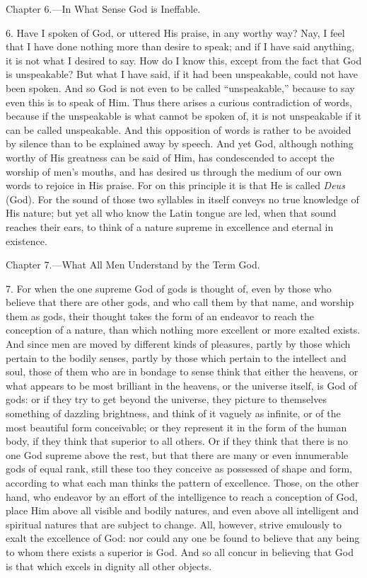
Chapter 6.—In What Sense God is Ineffable.

6. Have I spoken of God, or uttered His praise, in any worthy way? Nay, I feel that I have done nothing more than desire to speak; and if I have said anything, it is not what I desired to say. How do I know this, except from the fact that God is unspeakable? But what I have said, if it had been unspeakable, could not have been spoken. And so God is not even to be called “unspeakable,” because to say even this is to speak of Him. Thus there arises a curious contradiction of words, because if the unspeakable is what cannot be spoken of, it is not unspeakable if it can be called unspeakable. And this opposition of words is rather to be avoided by silence than to be explained away by speech. And yet God, although nothing worthy of His greatness can be said of Him, has condescended to accept the worship of men’s mouths, and has desired us through the medium of our own words to rejoice in His praise. For on this principle it is that He is called \emph{Deus} (God). For the sound of those two syllables in itself conveys no true knowledge of His nature; but yet all who know the Latin tongue are led, when that sound reaches their ears, to think of a nature supreme in excellence and eternal in existence.


Chapter 7.—What All Men Understand by the Term God.

7. For when the one supreme God of gods is thought of, even by those who believe that there are other gods, and who call them by that name, and worship them as gods, their thought takes the form of an endeavor to reach the conception of a nature, than which nothing more excellent or more exalted exists. And since men are moved by different kinds of pleasures, partly by those which pertain to the bodily senses, partly by those which pertain to the intellect and soul, those of them who are in bondage to sense think that either the heavens, or what appears to be most brilliant in the heavens, or the universe itself, is God of gods: or if they try to get beyond the universe, they picture to themselves something of dazzling brightness, and think of it vaguely as infinite, or of the most beautiful form conceivable; or they represent it in the form of the human body, if they think that superior to all others. Or if they think that there is no one God supreme above the rest, but that there are many or even innumerable gods of equal rank, still these too they conceive as possessed of shape and form, according to what each man thinks the pattern of excellence. Those, on the other hand, who endeavor by an effort of the intelligence to reach a conception of God, place Him above all visible and bodily natures, and even above all intelligent and spiritual natures that are subject to change. All, however, strive emulously to exalt the excellence of God: nor could any one be found to believe that any being to whom there exists a superior is God. And so all concur in believing that God is that which excels in dignity all other objects.

